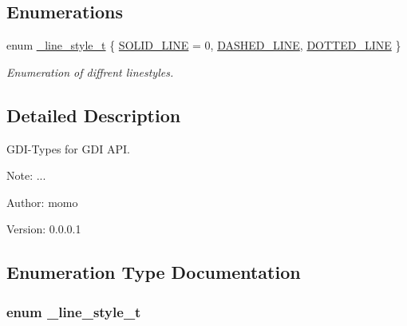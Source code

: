 \subsection*{Enumerations}
\begin{CompactItemize}
\item 
enum \hyperlink{group__hgdi__types_g8f4f6dec94a8b54dc690018424721e38}{\_\-line\_\-style\_\-t} \{ \hyperlink{group__hgdi__types_gg8f4f6dec94a8b54dc690018424721e38b67c7ec0d0b78acc6149f78bb54ebbb4}{SOLID\_\-LINE} =  0, 
\hyperlink{group__hgdi__types_gg8f4f6dec94a8b54dc690018424721e38e6560d9a7befef651165597a24779857}{DASHED\_\-LINE}, 
\hyperlink{group__hgdi__types_gg8f4f6dec94a8b54dc690018424721e386f0bcfa7a60895325f0522357956a9b6}{DOTTED\_\-LINE}
 \}
\begin{CompactList}\small\item\em Enumeration of diffrent linestyles. \item\end{CompactList}\end{CompactItemize}


\subsection{Detailed Description}
GDI-Types for GDI API. 

\begin{Desc}
\item[Note:]... \end{Desc}
\begin{Desc}
\item[Author:]momo \end{Desc}
\begin{Desc}
\item[Version:]0.0.0.1 \end{Desc}


\subsection{Enumeration Type Documentation}
\hypertarget{group__hgdi__types_g8f4f6dec94a8b54dc690018424721e38}{
\subsubsection[{\_\-line\_\-style\_\-t}]{\setlength{\rightskip}{0pt plus 5cm}enum {\bf \_\-line\_\-style\_\-t}}}
\label{group__hgdi__types_g8f4f6dec94a8b54dc690018424721e38}


